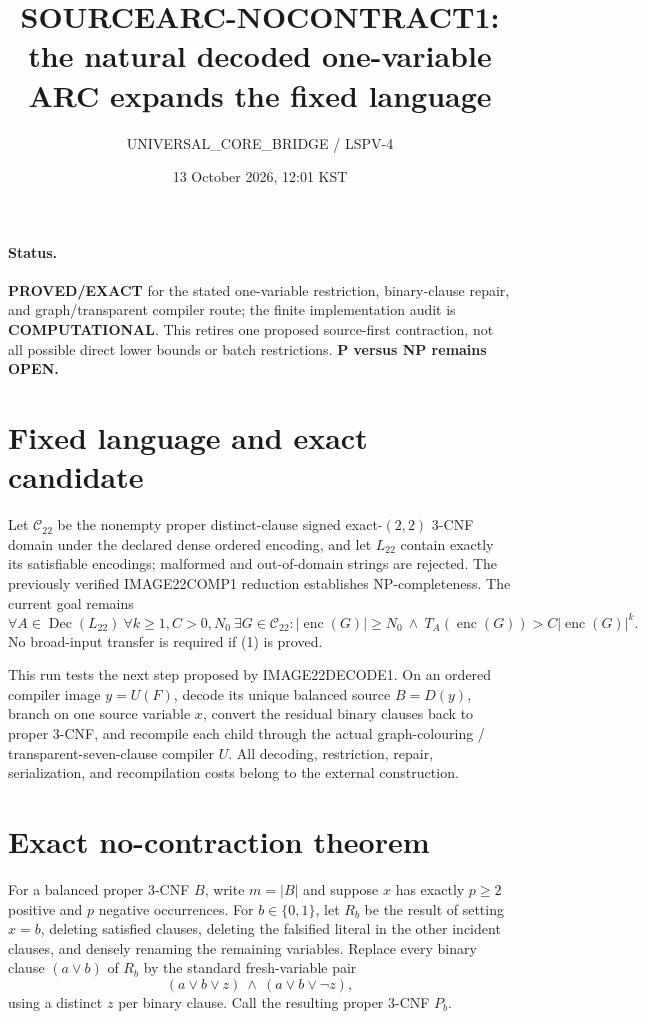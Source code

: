 \documentclass[11pt]{article}
\title{SOURCEARC-NOCONTRACT1: the natural decoded one-variable ARC expands the fixed language}
\author{UNIVERSAL\_CORE\_BRIDGE / LSPV-4}
\date{13 October 2026, 12:01 KST}
\begin{document}
\maketitle

\paragraph{Status.}
\textbf{PROVED/EXACT} for the stated one-variable restriction,
binary-clause repair, and graph/transparent compiler route; the finite
implementation audit is \textbf{COMPUTATIONAL}.  This retires one proposed
source-first contraction, not all possible direct lower bounds or batch
restrictions.  \textbf{P versus NP remains OPEN.}

\section{Fixed language and exact candidate}
Let $\mathcal C_{22}$ be the nonempty proper distinct-clause signed
exact-$(2,2)$ 3-CNF domain under the declared dense ordered encoding, and
let $L_{22}$ contain exactly its satisfiable encodings; malformed and
out-of-domain strings are rejected.  The previously verified IMAGE22COMP1
reduction establishes NP-completeness.  The current goal remains
\[
 \forall A\in\operatorname{Dec}(L_{22})\ \forall k\ge1,C>0,N_0\ \exists G\in\mathcal C_{22}:
 |\operatorname{enc}(G)|\ge N_0\ \land\
 T_A(\operatorname{enc}(G))>C|\operatorname{enc}(G)|^k.       \tag{1}
\]
No broad-input transfer is required if (1) is proved.

This run tests the next step proposed by IMAGE22DECODE1.  On an ordered
compiler image $y=U(F)$, decode its unique balanced source $B=D(y)$, branch
on one source variable $x$, convert the residual binary clauses back to
proper 3-CNF, and recompile each child through the actual graph-colouring /
transparent-seven-clause compiler $U$.  All decoding, restriction, repair,
serialization, and recompilation costs belong to the external construction.

\section{Exact no-contraction theorem}
For a balanced proper 3-CNF $B$, write $m=|B|$ and suppose $x$ has exactly
$p\ge2$ positive and $p$ negative occurrences.  For $b\in\{0,1\}$, let
$R_b$ be the result of setting $x=b$, deleting satisfied clauses, deleting
the falsified literal in the other incident clauses, and densely renaming
the remaining variables.  Replace every binary clause $(a\vee b)$ of $R_b$
by the standard fresh-variable pair
\[
 (a\vee b\vee z)\ \wedge\ (a\vee b\vee\neg z),             \tag{2}
\]
using a distinct $z$ per binary clause.  Call the resulting proper 3-CNF
$P_b$.
\end{document}
